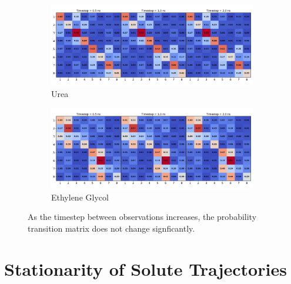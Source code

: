 \documentclass{article}
\begin{document}
  \begin{figure}
  \centering
  \begin{subfigure}{\textwidth}
  \includegraphics[width=\textwidth]{URE_transitions.pdf}
  \caption{Urea}\label{fig:URE_transitions}
  \end{subfigure}
  \begin{subfigure}{\textwidth}
  \includegraphics[width=\textwidth]{GCL_transitions.pdf}
  \caption{Ethylene Glycol}\label{fig:GCL_transitions}
  \end{subfigure}
  \caption{As the timestep between observations increases, the probability
  transition matrix does not change signficantly.}\label{fig:transitions}
  \end{figure}
  
  \section{Stationarity of Solute Trajectories}\label{section:msd_comparison}
  
\end{document}
